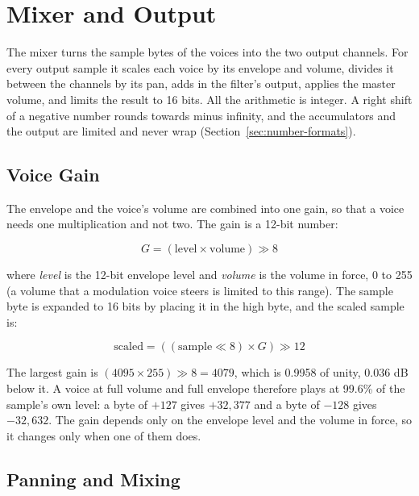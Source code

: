 \chapter{Mixer and Output}
\label{ch:mixer}

The mixer turns the sample bytes of the voices into the two output channels. For every output sample it scales each
voice by its envelope and volume, divides it between the channels by its pan, adds in the filter's output, applies the
master volume, and limits the result to 16 bits. All the arithmetic is integer. A right shift of a negative number
rounds towards minus infinity, and the accumulators and the output are limited and never wrap
(Section~\ref{sec:number-formats}).

\section{Voice Gain}
\label{sec:voice-gain}

The envelope and the voice's volume are combined into one gain, so that a voice needs one multiplication and not two.
The gain is a 12-bit number:

\begin{equation*}
	G = (\mathrm{level} \times \mathrm{volume}) \gg 8
\end{equation*}

\noindent where \emph{level} is the 12-bit envelope level and \emph{volume} is the volume in force, 0 to 255 (a volume that a
modulation voice steers is limited to this range). The sample byte is expanded to 16 bits by placing it in the high byte, and
the scaled sample is:

\begin{equation*}
	\mathrm{scaled} = ((\mathrm{sample} \ll 8) \times G) \gg 12
\end{equation*}

The largest gain is $(4095 \times 255) \gg 8 = 4079$, which is 0.9958 of unity, 0.036 dB below it. A voice at full
volume and full envelope therefore plays at 99.6\% of the sample's own level: a byte of $+127$ gives $+32{,}377$ and a
byte of $-128$ gives $-32{,}632$. The gain depends only on the envelope level and the volume in force, so it changes
only when one of them does.

\section{Panning and Mixing}
\label{sec:mixing}

